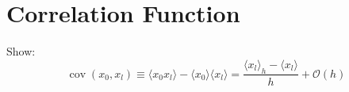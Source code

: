 \documentclass[11pt,a4paper]{scrartcl}
\newcommand{\SD}{\ensuremath{\mathcal{S}_{\mathrm{D}}}}
\newcommand{\xdoti}{\ensuremath{\dot{x}_i}}
\newcommand{\xdotj}{\ensuremath{\dot{x}_j}}
\newcommand{\xdotjm}{\ensuremath{\dot{x}_{j-1}}}
\newcommand{\deltaij}{\ensuremath{\delta_{ij}}}
\newcommand{\OverDeltaT}[1]{\ensuremath{\frac{#1}{\Delta t}}}
\newcommand{\DT}{\ensuremath{\mathrm{D}_t}}
\newcommand{\OverTwoDeltaT}[1]{\ensuremath{\frac{#1}{2\, \Delta t}}}
\newcommand{\xdotjp}{\ensuremath{\dot{x}_{j+1}}}
\newcommand{\avg}[1]{\langle#1\rangle}
\newcommand{\BigO}[1]{\mathcal{O}\left(#1\right)}
\DeclareMathOperator{\cov}{cov}
\begin{document}




\section*{Correlation Function}
Show:
\begin{equation*}
    \cov(x_0, x_l) \equiv \avg{x_0 x_l}-\avg{x_0}\avg{x_l}
    = \frac{\avg{x_l}_h-\avg{x_l}}{h}+\BigO{h}
\end{equation*}
\end{document}
